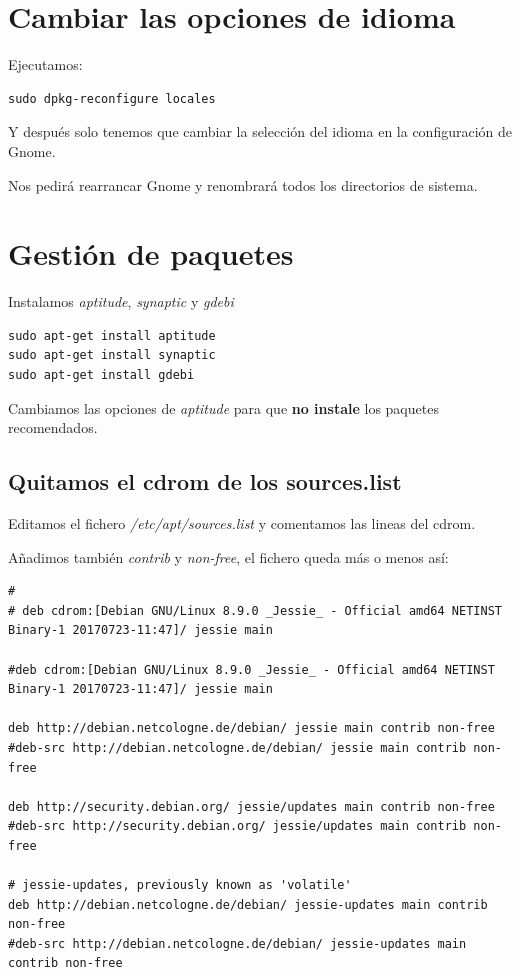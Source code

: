 \documentclass[12pt,spanish,]{scrartcl}
\begin{document}
\hypertarget{cambiar-las-opciones-de-idioma}{%
\section{Cambiar las opciones de
idioma}\label{cambiar-las-opciones-de-idioma}}

Ejecutamos:

\begin{verbatim}
sudo dpkg-reconfigure locales
\end{verbatim}

Y después solo tenemos que cambiar la selección del idioma en la
configuración de Gnome.

Nos pedirá rearrancar Gnome y renombrará todos los directorios de
sistema.

\hypertarget{gestiuxf3n-de-paquetes}{%
\section{Gestión de paquetes}\label{gestiuxf3n-de-paquetes}}

Instalamos \emph{aptitude}, \emph{synaptic} y \emph{gdebi}

\begin{verbatim}
sudo apt-get install aptitude
sudo apt-get install synaptic
sudo apt-get install gdebi
\end{verbatim}

Cambiamos las opciones de \emph{aptitude} para que \textbf{no instale}
los paquetes recomendados.

\hypertarget{quitamos-el-cdrom-de-los-sources.list}{%
\subsection{Quitamos el cdrom de los
sources.list}\label{quitamos-el-cdrom-de-los-sources.list}}

Editamos el fichero \emph{/etc/apt/sources.list} y comentamos las lineas
del cdrom.

Añadimos también \emph{contrib} y \emph{non-free}, el fichero queda más
o menos así:

\begin{verbatim}
# 
# deb cdrom:[Debian GNU/Linux 8.9.0 _Jessie_ - Official amd64 NETINST Binary-1 20170723-11:47]/ jessie main

#deb cdrom:[Debian GNU/Linux 8.9.0 _Jessie_ - Official amd64 NETINST Binary-1 20170723-11:47]/ jessie main

deb http://debian.netcologne.de/debian/ jessie main contrib non-free
#deb-src http://debian.netcologne.de/debian/ jessie main contrib non-free

deb http://security.debian.org/ jessie/updates main contrib non-free
#deb-src http://security.debian.org/ jessie/updates main contrib non-free

# jessie-updates, previously known as 'volatile'
deb http://debian.netcologne.de/debian/ jessie-updates main contrib non-free
#deb-src http://debian.netcologne.de/debian/ jessie-updates main contrib non-free
\end{verbatim}
\end{document}
